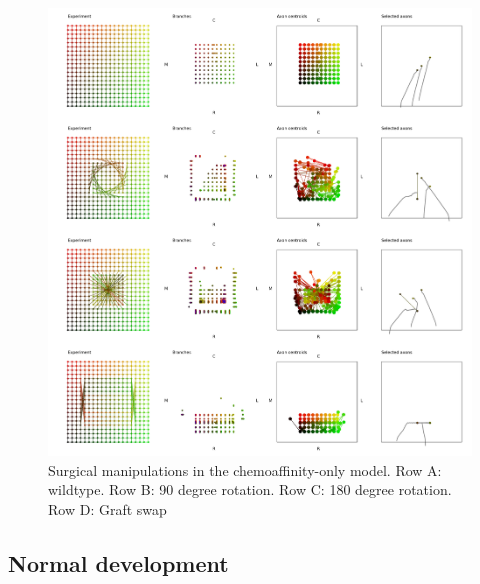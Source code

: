 \documentclass[11pt, a4paper]{article}
\begin{document}
\begin{figure}
\includegraphics[width=\linewidth]{./images/fig_chemo_manipulations.png}
\caption{Surgical manipulations in the chemoaffinity-only model. Row A: wildtype. Row B: 90 degree
rotation. Row C: 180 degree rotation. Row D: Graft swap}
\label{f:chsurg}
\end{figure}

\subsection*{Normal development}
\end{document}
